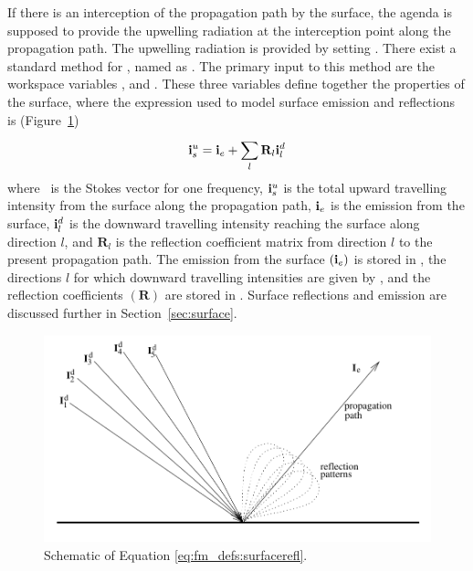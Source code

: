 If there is an interception of the propagation path by the surface,
the agenda  is supposed to provide the
upwelling radiation at the interception point along the propagation
path. The upwelling radiation is provided by setting .
There exist a standard method for ,
named as . The primary input to this method are
the workspace variables ,
 and . These three
variables define together the properties of the surface, where the
expression used to model surface emission and reflections is
(Figure~\ref{fig:fm_defs:surface_refl})
\begin{equation}
  \mathbf{i}_s^u = \mathbf{i}_e + \sum_l^{} \mathbf{R}_l \mathbf{i}_l^d
  \label{eq:fm_defs:surfacerefl}
\end{equation}
where \MpiVct\ is the Stokes vector for one frequency, $\mathbf{i}_s^u$
is the total upward travelling intensity from the surface along the
propagation path, $\mathbf{i}_e$ is the emission from the surface,
$\mathbf{i}_l^d$ is the downward travelling intensity reaching the
surface along direction $l$, and $\mathbf{R}_l$ is the reflection
coefficient matrix from direction $l$ to the present propagation path.
The emission from the surface $(\mathbf{i}_e)$ is stored in
, the directions $l$ for which downward
travelling intensities are given by , and the
reflection coefficients $(\mathbf{R})$ are stored in
. Surface reflections and emission are
discussed further in Section~\ref{sec:surface}.

\begin{figure}[!tb]
 \begin{center}
  \includegraphics*[width=0.95\hsize]{ground_refl}
  \caption{Schematic of Equation \ref{eq:fm_defs:surfacerefl}.}
  \label{fig:fm_defs:surface_refl}
 \end{center}
\end{figure}

